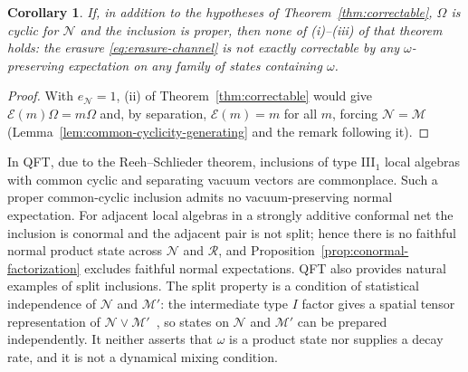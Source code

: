 \documentclass[a4paper,11pt]{article}
\newtheorem{corollary}[theorem]{Corollary}
\theoremstyle{definition}
\newcommand{\mR}{\mathcal{R}}
\newcommand{\mN}{\mathcal{N}}
\newcommand{\mM}{\mathcal{M}}
\newcommand{\mE}{\mathcal{E}}
\begin{document}
\begin{corollary}\label{cor:common-cyclic-noncorrectable}
If, in addition to the hypotheses of Theorem~\ref{thm:correctable}, $\Omega$ is cyclic for $\mN$ and the inclusion is proper, then none of {\rm(i)--(iii)} of that theorem holds: the erasure \eqref{eq:erasure-channel} is not exactly correctable by any $\omega$-preserving expectation on any family of states containing $\omega$.
\end{corollary}

\begin{proof}
With $e_{\mN}=1$, (ii) of Theorem~\ref{thm:correctable} would give $\mE(m)\Omega=m\Omega$ and, by separation, $\mE(m)=m$ for all $m$, forcing $\mN=\mM$ (Lemma~\ref{lem:common-cyclicity-generating} and the remark following it).
\end{proof}


In QFT, due to the Reeh--Schlieder theorem, inclusions of type III$_1$ local algebras with common cyclic and separating vacuum vectors are commonplace. Such a proper common-cyclic inclusion admits no vacuum-preserving normal expectation. For adjacent local algebras in a strongly additive conformal net the inclusion is conormal and the adjacent pair is not split; hence there is no faithful normal product state across $\mN$ and $\mR$, and Proposition~\ref{prop:conormal-factorization} excludes faithful normal expectations. QFT also provides natural examples of split inclusions. The split property is a condition of statistical independence of $\mN$ and $\mM'$: the intermediate type $I$ factor gives a spatial tensor representation of $\mN\vee\mM'$~\cite{standardinclusion}, so states on $\mN$ and $\mM'$ can be prepared independently. It neither asserts that $\omega$ is a product state nor supplies a decay rate, and it is not a dynamical mixing condition.
\end{document}
